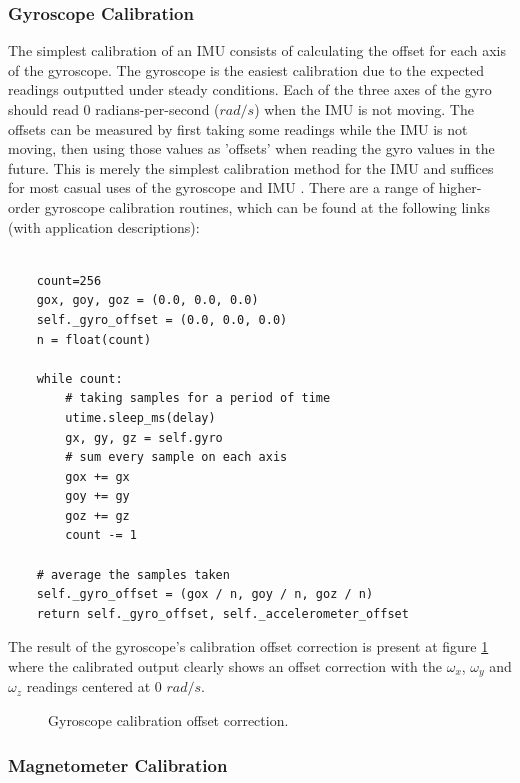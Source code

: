\subsubsection{Gyroscope Calibration}

The simplest calibration of an IMU consists of calculating the offset for each axis of the gyroscope. The gyroscope is the easiest calibration due to the expected readings outputted under steady conditions. Each of the three axes of the gyro should read 0 radians-per-second ($rad/s$) when the IMU is not moving. The offsets can be measured by first taking some readings while the IMU is not moving, then using those values as 'offsets' when reading the gyro values in the future. This is merely the simplest calibration method for the IMU and suffices for most casual uses of the gyroscope and IMU \cite{olivares2009high}. There are a range of  higher-order gyroscope calibration routines, which can be found at the following links (with application descriptions):

\lstset{language=Python}

\begin{lstlisting}[frame=single]  % Start your code-block

    count=256
    gox, goy, goz = (0.0, 0.0, 0.0)
    self._gyro_offset = (0.0, 0.0, 0.0) 
    n = float(count)

    while count:
        # taking samples for a period of time
        utime.sleep_ms(delay)
        gx, gy, gz = self.gyro
        # sum every sample on each axis
        gox += gx
        goy += gy
        goz += gz
        count -= 1

    # average the samples taken
    self._gyro_offset = (gox / n, goy / n, goz / n)
    return self._gyro_offset, self._accelerometer_offset
\end{lstlisting}

The result of the gyroscope's calibration offset correction is present at figure \ref{fig:gyroscope_calibration} where the calibrated output clearly shows an offset correction with the $\omega_x$, $\omega_y$  and $\omega_z$ readings centered at 0 $rad/s$.

\begin{figure}[!h]
    \centering
    \resizebox{0.8\linewidth}{!}{}
    \caption{Gyroscope calibration offset correction.}
    \label{fig:gyroscope_calibration}
\end{figure}

\subsubsection{Magnetometer Calibration}

